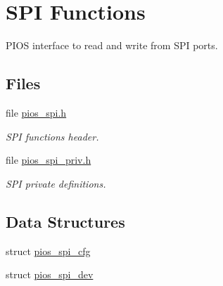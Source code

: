 \hypertarget{group___p_i_o_s___s_p_i}{\section{S\-P\-I Functions}
\label{group___p_i_o_s___s_p_i}
}


P\-I\-O\-S interface to read and write from S\-P\-I ports.  


\subsection*{Files}
\begin{DoxyCompactItemize}
\item 
file \hyperlink{pios__spi_8h}{pios\-\_\-spi.\-h}
\begin{DoxyCompactList}\small\item\em S\-P\-I functions header. \end{DoxyCompactList}\item 
file \hyperlink{pios__spi__priv_8h}{pios\-\_\-spi\-\_\-priv.\-h}
\begin{DoxyCompactList}\small\item\em S\-P\-I private definitions. \end{DoxyCompactList}\end{DoxyCompactItemize}
\subsection*{Data Structures}
\begin{DoxyCompactItemize}
\item 
struct \hyperlink{structpios__spi__cfg}{pios\-\_\-spi\-\_\-cfg}
\item 
struct \hyperlink{structpios__spi__dev}{pios\-\_\-spi\-\_\-dev}
\end{DoxyCompactItemize}
